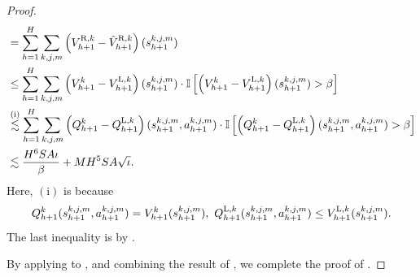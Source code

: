 \documentclass{article}
\newcommand{\LL}{\textnormal{L}}
\newcommand{\R}{\textnormal{R}}
\begin{document}
\begin{proof}
\begin{align}
    &= \sum_{h=1}^H\sum_{k,j,m} \left(V_{h+1}^{\R,k}-\hat{V}_{h+1}^{\R,k}\right)(s_{h+1}^{k,j,m}) \nonumber\\
    &\leq \sum_{h=1}^H\sum_{k,j,m} \left(V_{h+1}^{k}-V_{h+1}^{\LL,k}\right)(s_{h+1}^{k,j,m})\cdot\mathbb{I}\left[ \left(V_{h+1}^{k}-V_{h+1}^{\LL,k}\right)(s_{h+1}^{k,j,m}) > \beta\right] \nonumber\\
    &\overset{\mathrm{(i)}}{\lesssim} \sum_{h=1}^H\sum_{k,j,m} \left(Q_{h+1}^{k}-Q_{h+1}^{\LL,k}\right)(s_{h+1}^{k,j,m}, a_{h+1}^{k,j,m})\cdot\mathbb{I}\left[ \left(Q_{h+1}^{k}-Q_{h+1}^{\LL,k}\right)(s_{h+1}^{k,j,m}, a_{h+1}^{k,j,m}) > \beta\right] \nonumber\\
    &\lesssim \frac{H^6 S A \iota}{\beta}  + MH^5SA\sqrt{\iota}. \label{sumpsiupper}
\end{align}
Here, $\mathrm{(i)}$ is because $$Q_{h+1}^{k}(s_{h+1}^{k,j,m}, a_{h+1}^{k,j,m}) = V_{h+1}^k(s_{h+1}^{k,j,m}),\ Q_{h+1}^{\LL,k}(s_{h+1}^{k,j,m}, a_{h+1}^{k,j,m}) \leq V_{h+1}^{\LL,k}(s_{h+1}^{k,j,m}).$$ The last inequality is by . 

By applying  to , and combining the result of , we complete the proof of .
\end{proof}
\end{document}
